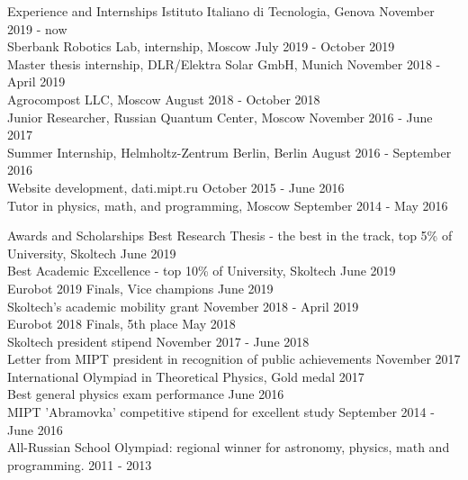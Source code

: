 \documentclass{resume} %
\begin{document}
\begin{rSection}{Experience and Internships} \itemsep -3pt  
{Istituto Italiano di Tecnologia, Genova} \hfill November 2019 - now \\
{Sberbank Robotics Lab, internship, Moscow} \hfill July 2019 - October 2019 \\
{Master thesis internship, DLR/Elektra Solar GmbH, Munich} \hfill November 2018 - April 2019 \\ 
{Agrocompost LLC, Moscow} \hfill August 2018 - October 2018 \\
{Junior Researcher, Russian Quantum Center, Moscow} \hfill November 2016 - June 2017 \\
{Summer Internship, Helmholtz-Zentrum Berlin, Berlin} \hfill August 2016 - September 2016\\
{Website development, dati.mipt.ru} \hfill October 2015 - June 2016 \\
{Tutor in physics, math, and programming, Moscow} \hfill September 2014 - May 2016 \\
\end{rSection} 


\begin{rSection}{Awards and Scholarships} \itemsep -3pt  
{Best Research Thesis - the best in the track, top 5\% of University, Skoltech} \hfill June 2019 \\
{Best Academic Excellence - top 10\% of University, Skoltech} \hfill June 2019 \\
{Eurobot 2019 Finals, Vice champions} \hfill June 2019 \\
{Skoltech's academic mobility grant} \hfill November 2018 - April 2019 \\  
{Eurobot 2018 Finals, 5th place} \hfill May 2018 \\
{Skoltech president stipend} \hfill November 2017 - June 2018 \\
{Letter from MIPT president in recognition of public achievements} \hfill November 2017\\
{International Olympiad in Theoretical Physics, Gold medal} \hfill 2017 \\
{Best general physics exam performance} \hfill June 2016 \\
{MIPT 'Abramovka' competitive stipend for excellent study} \hfill September 2014 - June 2016 \\
{All-Russian School Olympiad: regional winner for astronomy, physics, math and programming.} \hfill 2011 - 2013 \\
\end{rSection} 
\end{document}
